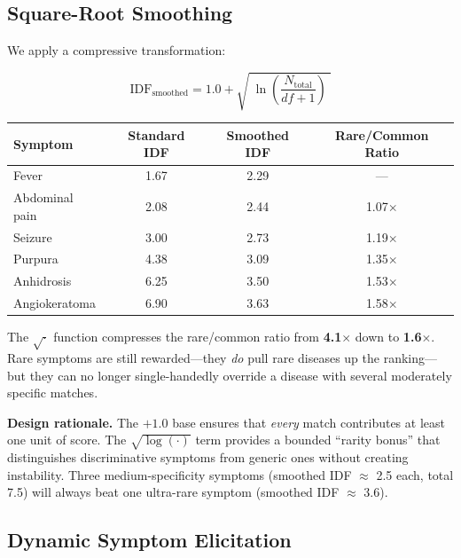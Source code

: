 \documentclass[11pt,a4paper]{article}
\begin{document}
\subsection{Square-Root Smoothing}

We apply a compressive transformation:

\begin{equation}
\text{IDF}_{\text{smoothed}} = 1.0 + \sqrt{\;\ln\left(\frac{N_{\text{total}}}{df + 1}\right)\;}
\end{equation}

\begin{table}[H]
\centering
\begin{tabular}{@{}lccc@{}}
\toprule
\textbf{Symptom} & \textbf{Standard IDF} & \textbf{Smoothed IDF} & \textbf{Rare/Common Ratio} \\
\midrule
Fever               & 1.67 & 2.29 & — \\
Abdominal pain      & 2.08 & 2.44 & 1.07$\times$ \\
Seizure             & 3.00 & 2.73 & 1.19$\times$ \\
Purpura             & 4.38 & 3.09 & 1.35$\times$ \\
Anhidrosis          & 6.25 & 3.50 & 1.53$\times$ \\
Angiokeratoma       & 6.90 & 3.63 & 1.58$\times$ \\
\bottomrule
\end{tabular}
\end{table}

The $\sqrt{\cdot}$ function compresses the rare/common ratio from \textbf{4.1$\times$} down to \textbf{1.6$\times$}. Rare symptoms are still rewarded—they \textit{do} pull rare diseases up the ranking—but they can no longer single-handedly override a disease with several moderately specific matches.

\begin{callout}
\textbf{Design rationale.} The $+1.0$ base ensures that \textit{every} match contributes at least one unit of score. The $\sqrt{\log(\cdot)}$ term provides a bounded ``rarity bonus'' that distinguishes discriminative symptoms from generic ones without creating instability. Three medium-specificity symptoms (smoothed IDF $\approx$ 2.5 each, total 7.5) will always beat one ultra-rare symptom (smoothed IDF $\approx$ 3.6).
\end{callout}

\subsection{Dynamic Symptom Elicitation}
\end{document}
